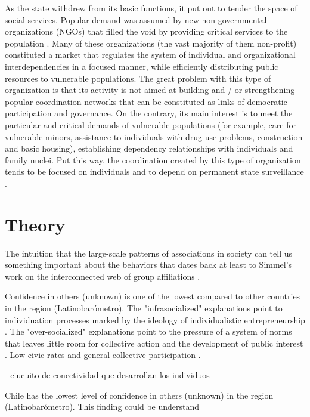 As the state withdrew from its basic functions, it put out to tender the space of social services. Popular demand was assumed by new non-governmental organizations (NGOs) that filled the void by providing critical services to the population  \parencite{boulding_community_2020, holzner_poverty_2007}. Many of these organizations (the vast majority of them non-profit) constituted a market that regulates the system of individual and organizational interdependencies in a focused manner, while efficiently distributing public resources to vulnerable populations. The great problem with this type of organization is that its activity is not aimed at building and / or strengthening popular coordination networks that can be constituted as links of democratic participation and governance. On the contrary, its main interest is to meet the particular and critical demands of vulnerable populations (for example, care for vulnerable minors, assistance to individuals with drug use problems, construction and basic housing), establishing dependency relationships with individuals and family nuclei. Put this way, the coordination created by this type of organization tends to be focused on individuals and to depend on permanent state surveillance \parencite{delamaza_redes_2012}.
\bigskip


\section{Theory}

The intuition that the large-scale patterns of associations in society can tell us something important about the behaviors that dates back at least to Simmel's work on the interconnected web of group affiliations \parencite{centola_how_2018}.

Confidence in others (unknown) is one of the lowest compared to other countries in the region (Latinobarómetro). The "infrasocialized" explanations point to individuation processes marked by the ideology of individualistic entrepreneurship \parencite{araujo_desafios_2012, yopo_individualizacion_2013}. The "over-socialized" explanations point to the pressure of a system of norms that leaves little room for collective action and the development of public interest \parencite{oxhorn_neopluralism_2004}. Low civic rates and general collective participation \parencite{espinoza_capital_2009}.

- ciucuito de conectividad que desarrollan los individuos 


Chile has the lowest level of confidence in others (unknown) in the region (Latinobarómetro). This finding could be understand 

